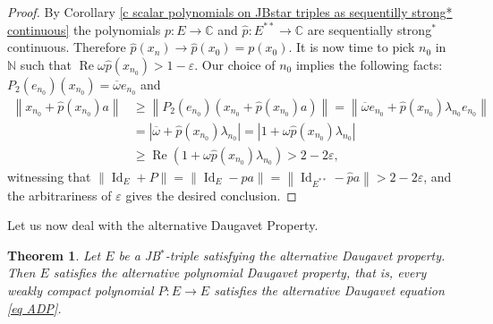 \documentclass[10pt]{amsart}
\newtheorem{theorem}{Theorem}[section]
\DeclareMathOperator{\re}{Re}
\DeclareMathOperator{\id}{Id}
\begin{document}
\begin{proof}
		By Corollary \ref{c scalar polynomials on JBstar triples as sequentilly strong* continuous} the polynomials $p\colon E\longrightarrow \mathbb{C}$ and $\hat{p} \colon E^{**}\longrightarrow \mathbb{C}$ are sequentially strong$^*$ continuous. Therefore $\hat{p} (x_n) \longrightarrow \hat{p}(x_{0})= p(x_0)$. It is now time to pick $n_0$ in $\mathbb{N}$ such that $\re\omega \hat{p}(x_{n_0}) > 1- \varepsilon.$ Our choice of $n_0$ implies the following facts: $P_2(e_{n_0}) (x_{n_0}) = \overline{\omega} e_{n_0}$ and $$\begin{aligned} \left\| x_{n_0} + \hat{p} (x_{n_0}) a \right\| & \geq \left\| P_2(e_{n_0}) \left(x_{n_0} + \hat{p} (x_{n_0}) a \right)\right\|
			= \left\| \overline{\omega} e_{n_0} + \hat{p} (x_{n_0})  \lambda_{n_0} e_{n_0}\right\| \\
			&= \left| \overline{\omega} + \hat{p} (x_{n_0})  \lambda_{n_0}  \right| = \left| 1 + {\omega} \hat{p} (x_{n_0})  \lambda_{n_0}  \right| \\
			&\geq \re \left( 1 + {\omega} \hat{p} (x_{n_0})  \lambda_{n_0}  \right) > 2 - 2 \varepsilon,
		\end{aligned}$$ witnessing that $\left\|\id_{E} + P \right\| = \left\|\id_{E} - {p} a\right\| = \left\|\id_{E^{**}} - \widehat{p} a\right\| > 2 - 2 \varepsilon$, and the arbitrariness of $\varepsilon$ gives the desired conclusion.
	\end{proof}	
	
	Let us now deal with the alternative Daugavet Property.
	
	\begin{theorem}\label{t ADPr for general wk polynomials} Let $E$ be a JB$^*$-triple satisfying the alternative Daugavet property. Then $E$ satisfies the alternative polynomial Daugavet property, that is, every weakly compact polynomial $P\colon E \longrightarrow E$ satisfies the alternative Daugavet equation \eqref{eq ADP}.
	\end{theorem}
	
\end{document}
